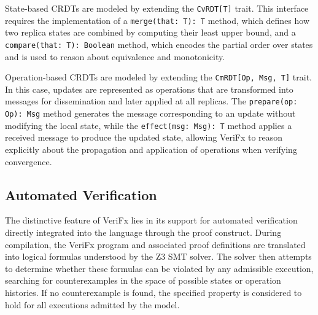 State-based CRDTs are modeled by extending the \texttt{CvRDT[T]} trait. This interface requires the implementation of a \texttt{merge(that: T): T} method, which defines how two replica states are combined by computing their least upper bound, and a \texttt{compare(that: T): Boolean} method, which encodes the partial order over states and is used to reason about equivalence and monotonicity.

Operation-based CRDTs are modeled by extending the \texttt{CmRDT[Op, Msg, T]} trait. In this case, updates are represented as operations that are transformed into messages for dissemination and later applied at all replicas. The \texttt{prepare(op: Op): Msg} method generates the message corresponding to an update without modifying the local state, while the \texttt{effect(msg: Msg): T} method applies a received message to produce the updated state, allowing VeriFx to reason explicitly about the propagation and application of operations when verifying convergence.

\subsection{Automated Verification}
\label{sub:automated_verification}

The distinctive feature of VeriFx lies in its support for automated verification directly integrated into the language through the proof construct. During compilation, the VeriFx program and associated proof definitions are translated into logical formulas understood by the Z3 SMT solver. The solver then attempts to determine whether these formulas can be violated by any admissible execution, searching for counterexamples in the space of possible states or operation histories. If no counterexample is found, the specified property is considered to hold for all executions admitted by the model.

